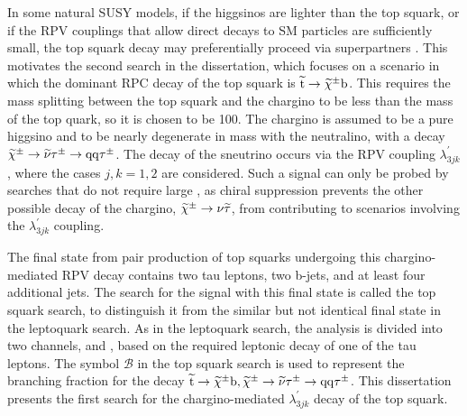 In some natural SUSY models, if the higgsinos are lighter than the top squark, or if the RPV couplings that allow direct decays to SM particles are sufficiently small, the top squark decay may preferentially proceed via superpartners \cite{Jared}. This motivates the second search in the dissertation, which focuses on a scenario in which the dominant RPC decay of the top squark is $\widetilde{\mathrm{t}} \rightarrow \widetilde{\chi}^{\pm}\mathrm{b}$. This requires the mass splitting between the top squark and the chargino to be less than the mass of the top quark, so it is chosen to be 100\GeV. The chargino is assumed to be a pure higgsino and to be nearly degenerate in mass with the neutralino, with a decay $\widetilde{\chi}^{\pm} \rightarrow \widetilde{\nu}\tau^{\pm} \rightarrow \mathrm{q}\mathrm{q}\tau^{\pm}$. The decay of the sneutrino occurs via the RPV coupling $\lambda_{3jk}^{\prime}$, where the cases $j, k = 1, 2$ are considered. Such a signal can only be probed by searches that do not require large \met, as chiral suppression prevents the other possible decay of the chargino, $\widetilde{\chi}^{\pm}\to\nu\widetilde{\tau}$, from contributing to scenarios involving the $\lambda_{3jk}^{\prime}$ coupling.

The final state from pair production of top squarks undergoing this chargino-mediated RPV decay contains two tau leptons, two b-jets, and at least four additional jets. The search for the signal with this final state is called the top squark search, to distinguish it from the similar but not identical final state in the leptoquark search. As in the leptoquark search, the analysis is divided into two channels, \etau and \mutau, based on the required leptonic decay of one of the tau leptons. The symbol $\mathcal{B}$ in the top squark search is used to represent the branching fraction for the decay $\widetilde{\mathrm{t}} \rightarrow \widetilde{\chi}^{\pm}\mathrm{b}, \widetilde{\chi}^{\pm} \rightarrow \widetilde{\nu}\tau^{\pm} \rightarrow \mathrm{q}\mathrm{q}\tau^{\pm}$.  This dissertation presents the first search for the chargino-mediated $\lambda_{3jk}^{\prime}$ decay of the top squark.

